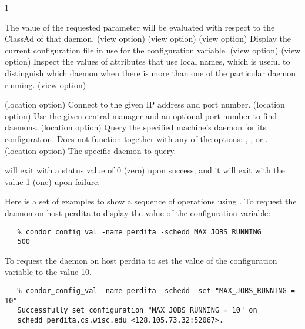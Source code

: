 \begin{ManPage}{\label{man-condor-config-val}}{1}
\begin{Options}
{    The value of the requested parameter will be evaluated with 
    respect to the ClassAd of that daemon.  
   }
   {(view option)
   }
   {(view option)
   }
   {(view option)
    Display the current configuration file in use for the configuration 
    variable.
   }
   {(view option)
   }
   {(view option) 
    Inspect the values of attributes that use local names,
    which is useful to distinguish which daemon when there is more than
    one of the particular daemon running.}
   {(view option) 
   }

   {(location option)
    Connect to the given IP address and port number. }
    {(location option) Use the given central manager and an optional 
    port number to find daemons. }
   { (location option)
    Query the specified
    machine's  daemon for its configuration. 
    Does not function together with any of the options:
    , , or . }
    {(location option) The specific daemon to query. }
\end{Options}

\ExitStatus

 will exit with a status value of 0 (zero) upon success,
and it will exit with the value 1 (one) upon failure.

\Examples

Here is a set of examples to show a sequence of operations using 
.
To request the  daemon on host perdita
to display the value of the  configuration variable:
\footnotesize
\begin{verbatim}
   % condor_config_val -name perdita -schedd MAX_JOBS_RUNNING
   500
\end{verbatim}
\normalsize

To request the  daemon on host perdita
to set the value of the  configuration variable
to the value 10.
\footnotesize
\begin{verbatim}
   % condor_config_val -name perdita -schedd -set "MAX_JOBS_RUNNING = 10"
   Successfully set configuration "MAX_JOBS_RUNNING = 10" on 
   schedd perdita.cs.wisc.edu <128.105.73.32:52067>.
\end{verbatim}
\normalsize


\end{ManPage}
